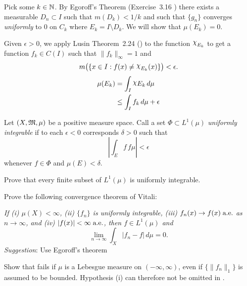 \begin{enumerate}
Pick some \(k\in\mathbb{N}\).
By Egoroff's Theorem (Exercise~3.16 \cite{RudinRCA87})
there exists a measurable \(D_n \subset I\) such that
\(m(D_k) < 1/k\) and such that
\(\{g_n\}\) converges \emph{uniformly} to $0$ on \(C_k\)
where \(E_k = I \setminus D_k\).
We will show that \(\mu(E_k) = 0\).
\iffalse
Hence
\begin{equation*}
\lim_{n\to\infty} \int_{E_k} g_n\,dm
\leq \bigl(1 - m(D_k)\bigr) \lim_{n\to\infty} \sup_{x\in E_k} g_n(x)
= 0.
\end{equation*}
\fi
Given \(\epsilon>0\), we
apply Lusin Theorem~2.24 (\cite{RudinRCA87}) to the function
\(\chhi_{E_k}\) to get a function \(f_k\in C(I)\)
such that \(\|f_k\|_\infty = 1\) and
\begin{equation*}
m\bigl(\{x\in I: f(x) \neq \chhi_{E_k}(x)\}\bigr) < \epsilon.
\end{equation*}
\begin{align*}
\mu(E_k)
&= \int_I \chhi{E_k}\,d\mu \\
&\leq \int_I f_k\,d\mu + \epsilon
\end{align*}




\begin{excopy}
Let \((X,\mathfrak{M},\mu)\) be a positive measure space. Call a set
\(\Phi \subset L^1(\mu)\)
\emph{uniformly  integrable}
if to each \(\epsilon < 0\) corresponds \(\delta>0\) such that
\begin{equation*}
\left|\int_E f\,f\mu\right| < \epsilon
\end{equation*}
whenever \(f\in\Phi\) and \(\mu(E) < \delta\).
\begin{itemize}

Prove that every finite subset of \(L^1(\mu)\) is uniformly integrable.

Prove the following convergence theorem of  Vitali:

\textsl{
If (i) \(\mu(X)<\infty\), (ii) \(\{f_n\}\) is uniformly integrable,
(iii) \(f_n(x)\to f(x)\;\textrm{a.e.}\) as \(n\to\infty\),
and (iv) \(|f(x)|<\infty\;\textrm{a.e.}\), then \(f\in L^1(\mu)\) and
\begin{equation*}
\lim_{n\to\infty} \int_X|f_n - f|\,d\mu = 0.
\end{equation*}
}
\emph{Suggestion}: Use  Egoroff's theorem

Show that  fails if \(\mu\) is a Lebesgue measure on
\((-\infty,\infty)\), even if \(\{\|f_n\|_1\}\) is assumed to be bounded.
Hypothesis (i) can therefore  not be omitted in .


\end{itemize}
\end{excopy}
\end{enumerate}
